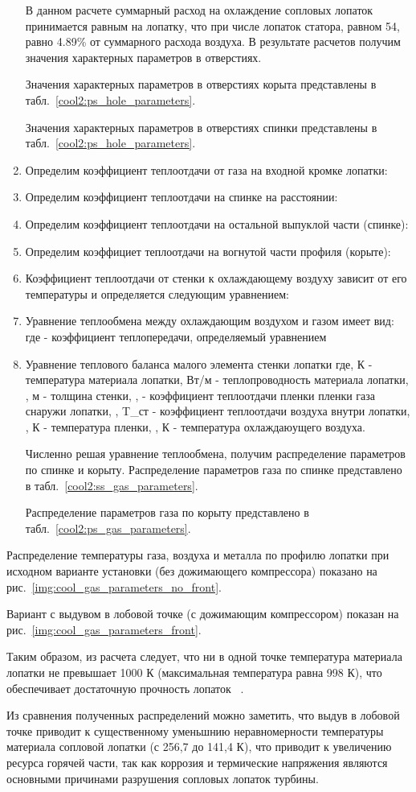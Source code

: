\begin{enumerate}
В данном расчете суммарный расход на охлаждение сопловых лопаток принимается равным
на лопатку, что при числе лопаток статора, равном 54, равно 4.89\% от суммарного расхода
воздуха.
В результате расчетов получим значения характерных параметров в отверстиях.

Значения характерных параметров в отверстиях корыта представлены в табл.~\ref{cool2:ps_hole_parameters}.

Значения характерных параметров в отверстиях спинки представлены в табл.~\ref{cool2:ps_hole_parameters}.


	\item Определим коэффициент теплоотдачи от газа на входной кромке лопатки:
	\item Определим коэффициент теплоотдачи на спинке на расстоянии:
	\item Определим коэффициент теплоотдачи на остальной выпуклой части (спинке):
	\item Определим коэффициет теплоотдачи на вогнутой части профиля (корыте):
	\item Коэффициент теплоотдачи от стенки к охлаждающему воздуху зависит от его температуры и определяется следующим уравнением:
	\item Уравнение теплообмена между охлаждающим воздухом и газом имеет вид:
	где - коэффициент теплопередачи, определяемый уравнением
	\item Уравнение теплового баланса малого элемента стенки лопатки
	где, К - температура материала лопатки,
	Вт/м - теплопроводность материала лопатки,
	, м - толщина стенки,
	, - коэффициент теплоотдачи пленки пленки газа снаружи лопатки,
	, T_{ст} - коэффициент теплоотдачи воздуха внутри лопатки,
	, К - температура пленки,
	, К - температура охлаждаюущего воздуха.

	Численно решая уравнение теплообмена, получим распределение параметров по спинке и корыту.
	Распределение параметров газа по спинке представлено в табл.~\ref{cool2:ss_gas_parameters}.
		
	Распределение параметров газа по корыту представлено в табл.~\ref{cool2:ps_gas_parameters}.
\end{enumerate}

Распределение температуры газа, воздуха и металла по профилю лопатки при исходном варианте установки
(без дожимающего компрессора) показано на рис.~\ref{img:cool_gas_parameters_no_front}.

Вариант с выдувом в лобовой точке (с дожимающим компрессором) показан на рис.~\ref{img:cool_gas_parameters_front}.

Таким образом, из расчета следует, что ни в одной точке температура материала лопатки не превышает 1000 К (максимальная температура
равна 998 К), что обеспечивает достаточную прочность лопаток
~\cite{js_36_properties}.

Из сравнения полученных распределений можно заметить, что выдув в лобовой точке приводит к существенному уменьшнию
неравномерности температуры материала сопловой лопатки (с 256,7 до 141,4 К), что приводит к увеличению ресурса горячей
части, так как коррозия и термические напряжения являются основными причинами разрушения сопловых лопаток турбины.